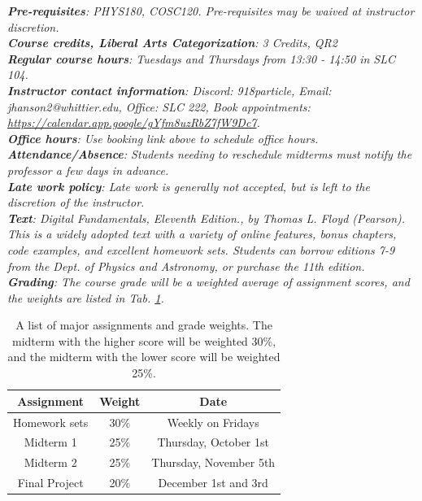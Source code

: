 \documentclass[10pt]{article}
\begin{document}
\noindent
\textit{\textbf{Pre-requisites}: PHYS180, COSC120.  Pre-requisites may be waived at instructor discretion.} \\
\textit{\textbf{Course credits, Liberal Arts Categorization}: 3 Credits, QR2} \\
\textit{\textbf{Regular course hours}: Tuesdays and Thursdays from 13:30 - 14:50 in SLC 104.} \\
\textit{\textbf{Instructor contact information}: Discord: 918particle, Email: jhanson2@whittier.edu, Office: SLC 222, Book appointments: \url{https://calendar.app.google/gYfm8uzRbZ7fW9Dc7}.} \\
\noindent
\textit{\textbf{Office hours}: Use booking link above to schedule office hours.} \\
\textit{\textbf{Attendance/Absence}: Students needing to reschedule midterms must notify the professor a few days in advance.} \\ 
\textit{\textbf{Late work policy}: Late work is generally not accepted, but is left to the discretion of the instructor.} \\
\textit{\textbf{Text}:  Digital Fundamentals, Eleventh Edition., by Thomas L. Floyd (Pearson).  This is a widely adopted text with a variety of online features, bonus chapters, code examples, and excellent homework sets.  Students can borrow editions 7-9 from the Dept. of Physics and Astronomy, or purchase the 11th edition.} \\
\textit{\textbf{Grading}: The course grade will be a weighted average of assignment scores, and the weights are listed in Tab. \ref{tab:grading}.}
\begin{table}[hb]
\centering
\begin{tabular}{| c | c | c |}
\hline
\textbf{Assignment} & \textbf{Weight} & \textbf{Date} \\ \hline
Homework sets & 30\% & Weekly on Fridays \\ \hline
Midterm 1 & 25\% & Thursday, October 1st \\ \hline
Midterm 2 & 25\% & Thursday, November 5th \\ \hline
Final Project & 20\% & December 1st and 3rd \\ \hline
\end{tabular}
\caption{\label{tab:grading} A list of major assignments and grade weights.  The midterm with the higher score will be weighted 30\%, and the midterm with the lower score will be weighted 25\%.}
\end{table} \\
\end{document}
